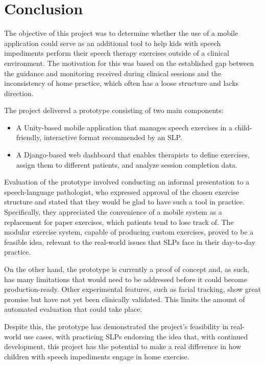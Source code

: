 \chapter{Conclusion}
\label{ch:conclusion}

The objective of this project was to determine whether the use of a mobile application could serve as an additional tool to help kids with speech impediments perform their speech therapy exercises outside of a clinical environment. The motivation for this was based on the established gap between the guidance and monitoring received during clinical sessions and the inconsistency of home practice, which often has a loose structure and lacks direction.

The project delivered a prototype consisting of two main components:

\begin{itemize}
    \item A Unity-based mobile application that manages speech exercises in a child-friendly, interactive format recommended by an SLP.
    \item A Django-based web dashboard that enables therapists to define exercises, assign them to different patients, and analyze session completion data.
\end{itemize}

Evaluation of the prototype involved conducting an informal presentation to a speech-language pathologist, who expressed approval of the chosen exercise structure and stated that they would be glad to have such a tool in practice. Specifically, they appreciated the convenience of a mobile system as a replacement for paper exercises, which patients tend to lose track of. The modular exercise system, capable of producing custom exercises, proved to be a feasible idea, relevant to the real-world issues that SLPs face in their day-to-day practice.

On the other hand, the prototype is currently a proof of concept and, as such, has many limitations that would need to be addressed before it could become production-ready. Other experimental features, such as facial tracking, show great promise but have not yet been clinically validated. This limits the amount of automated evaluation that could take place.

Despite this, the prototype has demonstrated the project's feasibility in real-world use cases, with practicing SLPs endorsing the idea that, with continued development, this project has the potential to make a real difference in how children with speech impediments engage in home exercise.
